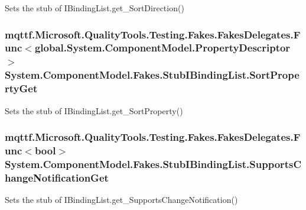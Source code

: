 Sets the stub of I\-Binding\-List.\-get\-\_\-\-Sort\-Direction()

\hypertarget{class_system_1_1_component_model_1_1_fakes_1_1_stub_i_binding_list_af1446b787c8ed130bd46c3c2be0c0e69}{
\subsubsection[{Sort\-Property\-Get}]{\setlength{\rightskip}{0pt plus 5cm}mqttf.\-Microsoft.\-Quality\-Tools.\-Testing.\-Fakes.\-Fakes\-Delegates.\-Func$<$global.\-System.\-Component\-Model.\-Property\-Descriptor$>$ System.\-Component\-Model.\-Fakes.\-Stub\-I\-Binding\-List.\-Sort\-Property\-Get}}\label{class_system_1_1_component_model_1_1_fakes_1_1_stub_i_binding_list_af1446b787c8ed130bd46c3c2be0c0e69}


Sets the stub of I\-Binding\-List.\-get\-\_\-\-Sort\-Property()

\hypertarget{class_system_1_1_component_model_1_1_fakes_1_1_stub_i_binding_list_ae766903000b1313f0095c765a973b397}{
\subsubsection[{Supports\-Change\-Notification\-Get}]{\setlength{\rightskip}{0pt plus 5cm}mqttf.\-Microsoft.\-Quality\-Tools.\-Testing.\-Fakes.\-Fakes\-Delegates.\-Func$<$bool$>$ System.\-Component\-Model.\-Fakes.\-Stub\-I\-Binding\-List.\-Supports\-Change\-Notification\-Get}}\label{class_system_1_1_component_model_1_1_fakes_1_1_stub_i_binding_list_ae766903000b1313f0095c765a973b397}


Sets the stub of I\-Binding\-List.\-get\-\_\-\-Supports\-Change\-Notification()

